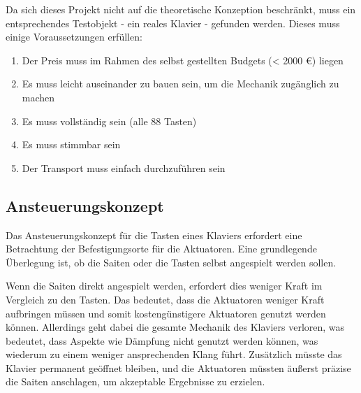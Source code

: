 Da sich dieses Projekt nicht auf die theoretische Konzeption beschränkt, muss ein entsprechendes Testobjekt - ein reales Klavier - gefunden werden.
Dieses muss einige Voraussetzungen erfüllen:
\begin{enumerate}
	\item 	Der Preis muss im Rahmen des selbst gestellten Budgets (< 2000 €) liegen %
	\item 	Es muss leicht auseinander zu bauen sein, um die Mechanik zugänglich zu machen
	\item 	Es muss vollständig sein (alle 88 Tasten)
	\item 	Es muss stimmbar sein
	\item 	Der Transport muss einfach durchzuführen sein
\end{enumerate}



\subsection{Ansteuerungskonzept} \label{konzeptionHW-ansteuerungskonzept}
Das Ansteuerungskonzept für die Tasten eines Klaviers erfordert eine Betrachtung der Befestigungsorte für
die Aktuatoren. Eine grundlegende Überlegung ist, ob die Saiten oder die Tasten selbst angespielt werden sollen. %

Wenn die Saiten direkt angespielt werden, erfordert dies weniger Kraft im Vergleich zu den Tasten.
Das bedeutet, dass die Aktuatoren weniger Kraft aufbringen müssen und somit kostengünstigere
Aktuatoren genutzt werden können. Allerdings geht
dabei die gesamte Mechanik des Klaviers verloren, was bedeutet, dass Aspekte wie Dämpfung nicht genutzt werden können,
was wiederum zu einem weniger ansprechenden Klang führt. Zusätzlich müsste das Klavier permanent geöffnet bleiben, und die
Aktuatoren müssten äußerst präzise die Saiten anschlagen, um akzeptable Ergebnisse zu erzielen.

